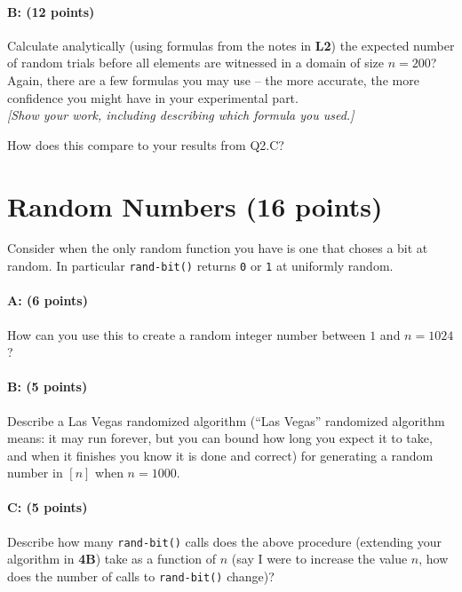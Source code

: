 \documentclass[11pt]{article}
\begin{document}
\paragraph{B: (12 points)}
Calculate analytically (using formulas from the notes in \textbf{L2}) the expected number of random trials before all elements are witnessed in a domain of size $n=200$?  Again, there are a few formulas you may use -- the more accurate, the more confidence you might have in your experimental part.  
\\ \emph{[Show your work, including describing which formula you used.]}

How does this compare to your results from \textsf{Q2.C}?

\section{Random Numbers (16 points)}

Consider when the only random function you have is one that choses a bit at random.  In particular \texttt{rand-bit()} returns \texttt{0} or \texttt{1} at uniformly random.  

\paragraph{A: (6 points)}
How can you use this to create a random integer number between $1$ and $n=1024$?  

\paragraph{B: (5 points)}
Describe a Las Vegas randomized algorithm (``Las Vegas'' randomized algorithm means: it may run forever, but you can bound how long you expect it to take, and when it finishes you know it is done and correct) for generating a random number in $[n]$ when $n=1000$.  

\paragraph{C: (5 points)}  
Describe how many \texttt{rand-bit()} calls does the above procedure (extending your algorithm in \textbf{4B}) take as a function of $n$ (say I were to increase the value $n$, how does the number of calls to \texttt{rand-bit()} change)?  
\end{document}
